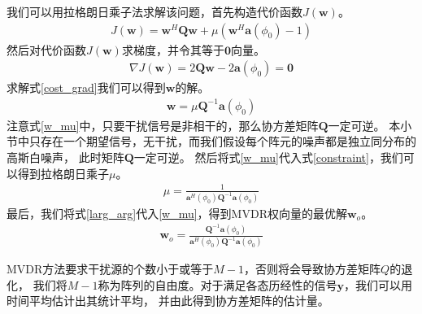 \documentclass[master]{thesis-uestc}
\begin{document}
我们可以用拉格朗日乘子法求解该问题，首先构造代价函数$J(\bm{w})$。
\begin{equation}
    \begin{aligned}
    J(\bm{w}) = \bm{w}^H\bm{Q}\bm{w} + \mu\left(\bm{w}^H\bm{a}(\phi_0)-1\right)
    \end{aligned}
\end{equation}
然后对代价函数$J(\bm{w})$求梯度，并令其等于$\textbf{0}$向量。
\begin{equation}\label{cost_grad}
    \begin{aligned}
    \nabla J(\bm{w}) = 2\bm{Q}\bm{w} - 2\bm{a}(\phi_0) = \textbf{0}
    \end{aligned}
\end{equation}
求解式\eqref{cost_grad}我们可以得到$\bm{w}$的解。
\begin{equation}\label{w_mu}
    \begin{aligned}
    \bm{w} = \mu\bm{Q}^{-1}\bm{a}(\phi_0)
    \end{aligned}
\end{equation}
注意式\eqref{w_mu}中，只要干扰信号是非相干的，那么协方差矩阵$\bm{Q}$一定可逆。
本小节中只存在一个期望信号，无干扰，而我们假设每个阵元的噪声都是独立同分布的高斯白噪声，
此时矩阵$\bm{Q}$一定可逆。
然后将式\eqref{w_mu}代入式\eqref{constraint}，我们可以得到拉格朗日乘子$\mu$。
\begin{equation}\label{larg_arg}
    \begin{aligned}
    \mu = \frac{1}{\bm{a}^H(\phi_0)\bm{Q}^{-1}\bm{a}(\phi_0)}
    \end{aligned}
\end{equation}
最后，我们将式\eqref{larg_arg}代入\eqref{w_mu}，得到MVDR权向量的最优解$\bm{w}_o$。
\begin{equation}\label{w_solve}
    \begin{aligned}
    \bm{w}_o = \frac{\bm{Q}^{-1}\bm{a}(\phi_0)}{\bm{a}^H(\phi_0)\bm{Q}^{-1}\bm{a}(\phi_0)}
    \end{aligned}
\end{equation}

MVDR方法要求干扰源的个数小于或等于$M-1$，否则将会导致协方差矩阵$Q$的退化，
我们将$M-1$称为阵列的自由度。对于满足各态历经性的信号$\bm{y}$，我们可以用时间平均估计出其统计平均，
并由此得到协方差矩阵的估计量。

\end{document}
